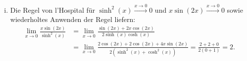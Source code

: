 \documentclass{theozettel}
\begin{document}
\begin{enumerate}[(i)]
	\item 	Die Regel von l'Hospital für $\sinh^{2}(x)\stackrel{x \to 0}{\longrightarrow} 0$ und $ x\sin(2x) \stackrel{x \to 0}{\longrightarrow} 0$ sowie wiederholtes Anwenden der Regel liefern:
			\begin{align*}
				\lim_{x \to 0} \frac{x\sin(2x)}{\sinh^{2}(x)} &= \lim_{x \to 0} \frac{\sin(2x) + 2x\cos(2x)}{2\sinh(x)\cosh(x)} \\
				&= \lim_{x \to 0} \frac{2\cos(2x) + 2 \cos(2x) + 4x\sin(2x)}{2(\sinh^{2}(x) + \cosh^{2}(x))} = \frac{2+2+0}{2(0+1)} = 2.
			\end{align*}
\end{enumerate}
\end{document}
